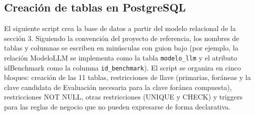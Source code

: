 \documentclass[12pt,a4paper]{article}
\begin{document}
\subsection{Creación de tablas en PostgreSQL}

El siguiente script crea la base de datos a partir del modelo relacional de la sección 3. Siguiendo la convención del proyecto de referencia, los nombres de tablas y columnas se escriben en minúsculas con guion bajo (por ejemplo, la relación ModeloLLM se implementa como la tabla \texttt{modelo\_llm} y el atributo idBenchmark como la columna \texttt{id\_benchmark}). El script se organiza en cinco bloques: creación de las 11 tablas, restricciones de llave (primarias, foráneas y la clave candidata de Evaluación necesaria para la clave foránea compuesta), restricciones NOT NULL, otras restricciones (UNIQUE y CHECK) y triggers para las reglas de negocio que no pueden expresarse de forma declarativa.
\end{document}
